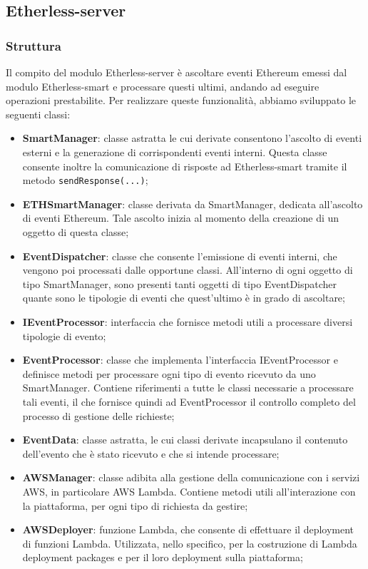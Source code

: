 \subsection{Etherless-server}
\subsubsection{Struttura}
Il compito del modulo Etherless-server è ascoltare eventi Ethereum emessi dal modulo Etherless-smart e processare questi ultimi, andando ad eseguire operazioni prestabilite. Per realizzare queste funzionalità, abbiamo sviluppato le seguenti classi:
\begin{itemize}
	\item \textbf{SmartManager}: classe astratta le cui derivate consentono l'ascolto di eventi esterni e la generazione di corrispondenti eventi interni. Questa classe consente inoltre la comunicazione di risposte ad Etherless-smart tramite il metodo \texttt{sendResponse(...)};
	\item \textbf{ETHSmartManager}: classe derivata da SmartManager, dedicata all'ascolto di eventi Ethereum. Tale ascolto inizia al momento della creazione di un oggetto di questa classe;
	\item \textbf{EventDispatcher}: classe che consente l'emissione di eventi interni, che vengono poi processati dalle opportune classi. All'interno di ogni oggetto di tipo SmartManager, sono presenti tanti oggetti di tipo EventDispatcher quante sono le tipologie di eventi che quest'ultimo è in grado di ascoltare;
	\item \textbf{IEventProcessor}: interfaccia che fornisce metodi utili a processare diversi tipologie di evento;
	\item \textbf{EventProcessor}: classe che implementa l'interfaccia IEventProcessor e definisce metodi per processare ogni tipo di evento ricevuto da uno SmartManager. Contiene riferimenti a tutte le classi necessarie a processare tali eventi, il che fornisce quindi ad EventProcessor il controllo completo del processo di gestione delle richieste;
	\item \textbf{EventData}: classe astratta, le cui classi derivate incapsulano il contenuto dell'evento che è stato ricevuto e che si intende processare;
	\item \textbf{AWSManager}: classe adibita alla gestione della comunicazione con i servizi AWS, in particolare AWS Lambda. Contiene metodi utili all'interazione con la piattaforma, per ogni tipo di richiesta da gestire;
	\item \textbf{AWSDeployer}: funzione Lambda, che consente di effettuare il deployment di funzioni Lambda. Utilizzata, nello specifico, per la costruzione di Lambda deployment packages e per il loro deployment sulla piattaforma;

\end{itemize}

